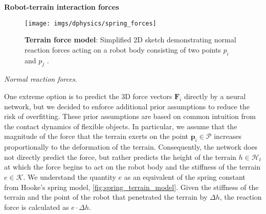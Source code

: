 \textbf{Robot-terrain interaction forces}

\begin{figure}[t]
    \centering
    \texttt{[image: imgs/dphysics/spring\_forces]}
    \caption{\textbf{Terrain force model}: Simplified 2D sketch demonstrating
    normal reaction forces acting on a robot body consisting of two points $p_i$ and $p_j$ .}
    \label{fig:spring_terrain_model}
\end{figure}

\textit{Normal reaction forces}.

One extreme option is to predict the 3D force vectors $\mathbf{F}_i$ directly
by a neural network, but we decided to enforce additional prior assumptions to reduce the risk of overfitting.
These prior assumptions are based on common intuition from the contact dynamics of flexible objects.
In particular, we assume that the magnitude of the force that the terrain exerts on the point $\mathbf{p}_i\in \mathcal{P}$
increases proportionally to the deformation of the terrain.
Consequently, the network does not directly predict the force,
but rather predicts the height of the terrain $h\in\mathcal{H}_t$
at which the force begins to act on the robot body and the stiffness of the terrain $e\in\mathcal{K}$.
We understand the quantity $e$ as an equivalent of the spring constant from Hooke's spring model, \autoref{fig:spring_terrain_model}.
Given the stiffness of the terrain and the point of the robot that penetrated the terrain
by ${\Delta}h$, the reaction force is calculated as $e\cdot{\Delta}h$.

